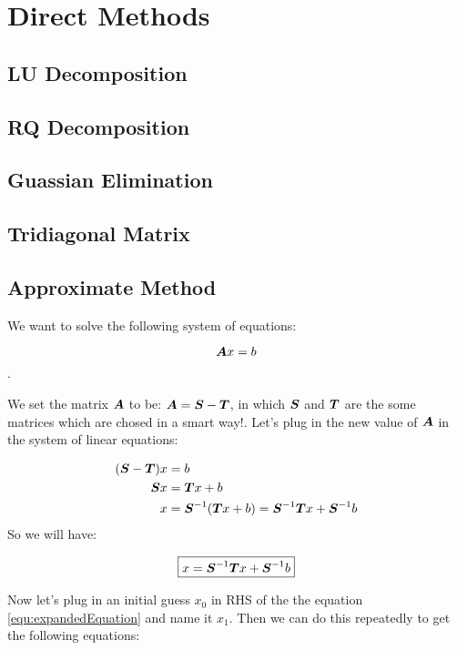 



\section{Direct Methods}
\subsection{LU Decomposition}

\subsection{RQ Decomposition}

\subsection{Guassian Elimination}

\subsection{Tridiagonal Matrix}

\subsection{Approximate Method}

We want to solve the following system of equations:

\[ \boldsymbol{A} x = b \].

We set the matrix $\boldsymbol{A}$ to be: $\boldsymbol{A} = \boldsymbol{S} - \boldsymbol{T}$, in which $\boldsymbol{S}$ and $\boldsymbol{T}$ are the some matrices which are chosed in a smart way!. Let's plug in the new value of $\boldsymbol{A}$ in the system of linear equations:

\begin{align*}
	(\boldsymbol{S} - \boldsymbol{T}) x &= b \\
	\boldsymbol{S} x &= \boldsymbol{T} x + b \\
	x &= \boldsymbol{S}^{-1} (\boldsymbol{T} x + b) =  \boldsymbol{S}^{-1} \boldsymbol{T} x + \boldsymbol{S}^{-1} b \\
\end{align*}
So we will have:

\begin{equation}
	\boxed{x = \boldsymbol{S}^{-1} \boldsymbol{T} x + \boldsymbol{S}^{-1} b}
	\label{equ:expandedEquation}
\end{equation}

Now let's plug in an initial guess $x_0$ in RHS of the the equation \ref{equ:expandedEquation} and name it $x_1$. Then we can do this repeatedly to get the following equations:



